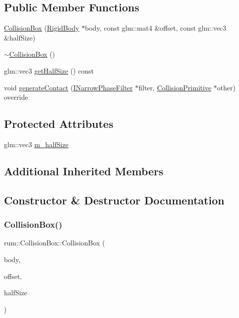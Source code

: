 \subsection*{Public Member Functions}
\begin{DoxyCompactItemize}
\item 
\mbox{\hyperlink{classrum_1_1_collision_box_a8b829760e2fb5c6ae02753067e0575d5}{Collision\+Box}} (\mbox{\hyperlink{classrum_1_1_rigid_body}{Rigid\+Body}} $\ast$body, const glm\+::mat4 \&offset, const glm\+::vec3 \&half\+Size)
\item 
\mbox{\hyperlink{classrum_1_1_collision_box_a3e480bda7dc21dad54dbc18bf38a7da3}{$\sim$\+Collision\+Box}} ()
\item 
glm\+::vec3 \mbox{\hyperlink{classrum_1_1_collision_box_a41fd485b6fc134f77a83efba31f19543}{get\+Half\+Size}} () const
\item 
void \mbox{\hyperlink{classrum_1_1_collision_box_a3f72c354e24f866be640f0b3f8e2a4b4}{generate\+Contact}} (\mbox{\hyperlink{classrum_1_1_i_narrow_phase_filter}{I\+Narrow\+Phase\+Filter}} $\ast$filter, \mbox{\hyperlink{classrum_1_1_collision_primitive}{Collision\+Primitive}} $\ast$other) override
\end{DoxyCompactItemize}
\subsection*{Protected Attributes}
\begin{DoxyCompactItemize}
\item 
glm\+::vec3 \mbox{\hyperlink{classrum_1_1_collision_box_ac154420e43adf96a09bd6d1340987bb5}{m\+\_\+half\+Size}}
\end{DoxyCompactItemize}
\subsection*{Additional Inherited Members}


\subsection{Constructor \& Destructor Documentation}
\mbox{\label{classrum_1_1_collision_box_a8b829760e2fb5c6ae02753067e0575d5}} 
\subsubsection{\texorpdfstring{Collision\+Box()}{CollisionBox()}}
{\footnotesize\ttfamily rum\+::\+Collision\+Box\+::\+Collision\+Box (\begin{DoxyParamCaption}\item[{\mbox{\hyperlink{classrum_1_1_rigid_body}{Rigid\+Body}} $\ast$}]{body,  }\item[{const glm\+::mat4 \&}]{offset,  }\item[{const glm\+::vec3 \&}]{half\+Size }\end{DoxyParamCaption})\hspace{0.3cm}{\ttfamily [explicit]}}

